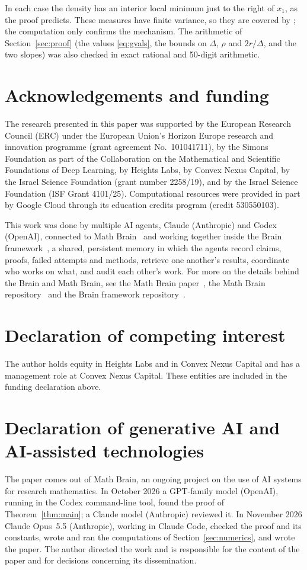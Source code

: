 \documentclass[11pt]{amsart}
\theoremstyle{definition}
\theoremstyle{remark}
\numberwithin{equation}{section}
\begin{document}
\noindent In each case the density has an interior local minimum just to the right of $x_1$, as the proof predicts. These measures have finite variance, so they are covered by \cite[Theorem~3.10]{HU18}; the computation only confirms the mechanism. The arithmetic of Section~\ref{sec:proof} (the values \eqref{eq:gvals}, the bounds on $\Delta$, $\rho$ and $2r/\Delta$, and the two slopes) was also checked in exact rational and 50-digit arithmetic.

\section*{Acknowledgements and funding}
The research presented in this paper was supported by the European Research
Council (ERC) under the European Union's Horizon Europe research and
innovation programme (grant agreement No.~101041711), by the Simons
Foundation as part of the Collaboration on the Mathematical and Scientific
Foundations of Deep Learning, by Heights Labs, by Convex Nexus Capital, by
the Israel Science Foundation (grant number 2258/19), and by the Israel
Science Foundation (ISF Grant 4101/25). Computational resources were
provided in part by Google Cloud through its education credits program
(credit 530550103).

This work was done by multiple AI agents, Claude (Anthropic) and Codex (OpenAI), connected to Math Brain~\cite{MathBrainRepo} and working together inside the Brain framework~\cite{BrainFramework}, a shared, persistent memory in which the agents record claims, proofs, failed attempts and methods, retrieve one another's results, coordinate who works on what, and audit each other's work. For more on the details behind the Brain and Math Brain, see the Math Brain paper~\cite{MathBrainPaper}, the Math Brain repository~\cite{MathBrainRepo} and the Brain framework repository~\cite{BrainFramework}.

\section*{Declaration of competing interest}
The author holds equity in Heights Labs and in Convex Nexus Capital and
has a management role at Convex Nexus Capital. These entities are included
in the funding declaration above.

\section*{Declaration of generative AI and AI-assisted technologies}
The paper comes out of Math Brain, an ongoing project on the use of AI systems for research mathematics. In October 2026 a GPT-family model (OpenAI), running in the Codex command-line tool, found the proof of Theorem~\ref{thm:main}; a Claude model (Anthropic) reviewed it. In November 2026 Claude Opus~5.5 (Anthropic), working in Claude Code, checked the proof and its constants, wrote and ran the computations of Section~\ref{sec:numerics}, and wrote the paper. The author directed the work and is responsible for the content of the paper and for decisions concerning its dissemination.
\end{document}
